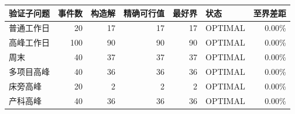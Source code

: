 \begin{tabular}{lrrrrlr}
\toprule
验证子问题 & 事件数 & 构造解 & 精确可行值 & 最好界 & 状态 & 至界差距 \\
\midrule
普通工作日 & 20 & 17 & 17 & 17 & OPTIMAL & 0.00\% \\
高峰工作日 & 100 & 90 & 90 & 90 & OPTIMAL & 0.00\% \\
周末 & 40 & 37 & 37 & 37 & OPTIMAL & 0.00\% \\
多项目高峰 & 40 & 36 & 36 & 36 & OPTIMAL & 0.00\% \\
床旁高峰 & 20 & 2 & 2 & 2 & OPTIMAL & 0.00\% \\
产科高峰 & 40 & 36 & 36 & 36 & OPTIMAL & 0.00\% \\
\bottomrule
\end{tabular}
